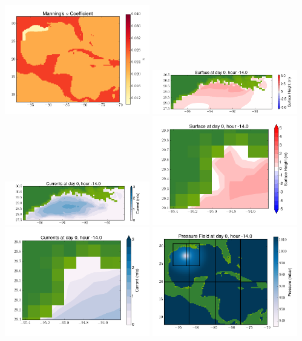 \documentclass[11pt]{article}
\begin{document}
\vskip 10pt 
\includegraphics[width=0.475\textwidth]{frame0058fig3.png}
\includegraphics[width=0.475\textwidth]{frame0058fig4.png}
\vskip 10pt 
\includegraphics[width=0.475\textwidth]{frame0058fig5.png}
\includegraphics[width=0.475\textwidth]{frame0058fig6.png}
\vskip 10pt 
\includegraphics[width=0.475\textwidth]{frame0058fig7.png}
\includegraphics[width=0.475\textwidth]{frame0058fig8.png}
\end{document}
